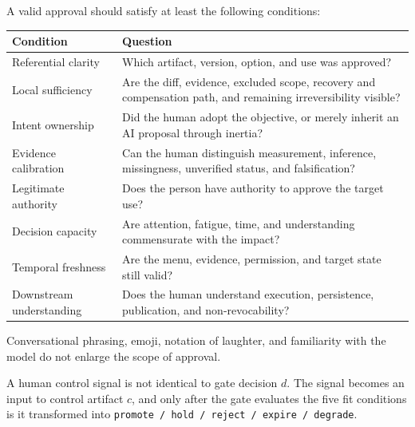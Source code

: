 A valid approval should satisfy at least the following conditions:

{\def\LTcaptype{none} %
\begin{longtable}[]{@{}
  >{\raggedright\arraybackslash}p{}
  >{\raggedright\arraybackslash}p{}@{}}
\toprule\noalign{}
\begin{minipage}[b]{\linewidth}\raggedright
Condition
\end{minipage} & \begin{minipage}[b]{\linewidth}\raggedright
Question
\end{minipage} \\
\midrule\noalign{}
\endhead
\bottomrule\noalign{}
\endlastfoot
Referential clarity & Which artifact, version, option, and use was approved? \\
Local sufficiency & Are the diff, evidence, excluded scope, recovery and compensation path, and remaining irreversibility visible? \\
Intent ownership & Did the human adopt the objective, or merely inherit an AI proposal through inertia? \\
Evidence calibration & Can the human distinguish measurement, inference, missingness, unverified status, and falsification? \\
Legitimate authority & Does the person have authority to approve the target use? \\
Decision capacity & Are attention, fatigue, time, and understanding commensurate with the impact? \\
Temporal freshness & Are the menu, evidence, permission, and target state still valid? \\
Downstream understanding & Does the human understand execution, persistence, publication, and non-revocability? \\
\end{longtable}
}

Conversational phrasing, emoji, notation of laughter, and familiarity with the model do not enlarge the scope of approval.

A human control signal is not identical to gate decision \(d\). The signal becomes an input to control artifact \(c\), and only after the gate evaluates the five fit conditions is it transformed into \passthrough{\lstinline!promote / hold / reject / expire / degrade!}.

